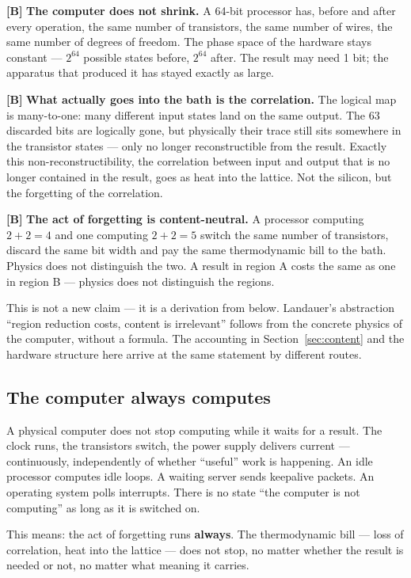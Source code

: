 \textbf{[B]} \textbf{The computer does not shrink.} A 64-bit processor has, before and
after every operation, the same number of transistors, the same number of wires,
the same number of degrees of freedom. The phase space of the hardware stays
constant --- $2^{64}$ possible states before, $2^{64}$ after. The result may need
1 bit; the apparatus that produced it has stayed exactly as large.

\textbf{[B]} \textbf{What actually goes into the bath is the correlation.} The logical map
is many-to-one: many different input states land on the same output. The 63
discarded bits are logically gone, but physically their trace still sits somewhere
in the transistor states --- only no longer reconstructible from the result.
Exactly this non-reconstructibility, the correlation between input and output that
is no longer contained in the result, goes as heat into the lattice. Not the
silicon, but the forgetting of the correlation.

\textbf{[B]} \textbf{The act of forgetting is content-neutral.} A processor computing
$2+2=4$ and one computing $2+2=5$ switch the same number of transistors, discard
the same bit width and pay the same thermodynamic bill to the bath. Physics does
not distinguish the two. A result in region A costs the same as one in region B
--- physics does not distinguish the regions.

This is not a new claim --- it is a derivation from below. Landauer's abstraction
“region reduction costs, content is irrelevant” follows from the concrete physics
of the computer, without a formula. The accounting in Section~\ref{sec:content}
and the hardware structure here arrive at the same statement by different routes.

\subsection{The computer always computes}
\label{sec:always}

A physical computer does not stop computing while it waits for a result. The clock
runs, the transistors switch, the power supply delivers current --- continuously,
independently of whether “useful” work is happening. An idle processor computes
idle loops. A waiting server sends keepalive packets. An operating system polls
interrupts. There is no state “the computer is not computing” as long as it is
switched on.

This means: the act of forgetting runs \textbf{always}. The thermodynamic bill ---
loss of correlation, heat into the lattice --- does not stop, no matter whether
the result is needed or not, no matter what meaning it carries.

